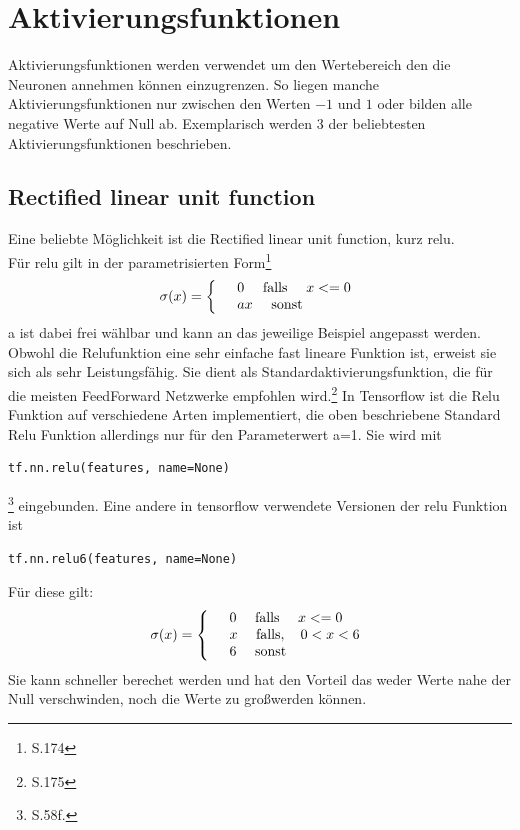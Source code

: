 \section{Aktivierungsfunktionen}
Aktivierungsfunktionen werden verwendet um den Wertebereich den die Neuronen annehmen k\"onnen einzugrenzen. So liegen manche Aktivierungsfunktionen nur zwischen den Werten $-1$ und $1$ oder bilden alle negative Werte auf Null ab. Exemplarisch werden 3 der beliebtesten Aktivierungsfunktionen beschrieben.
\subsection{Rectified linear unit function} \label{sub:relu}
Eine beliebte M\"oglichkeit ist die Rectified linear unit function, kurz relu.\\
F\"ur relu gilt in der parametrisierten Form\footnote{\cite{Goodfellow}S.174 }
\begin{align*}
\sigma(x)=
\left\{
\begin{array}{l l}
& 0 \quad \text{   falls  } \quad x <= 0  \\ 
& ax \quad \text{   sonst}
\end{array}
\right.
\end{align*}
a ist dabei frei w\"ahlbar und kann an das jeweilige Beispiel angepasst werden. Obwohl die Relufunktion eine sehr einfache fast lineare Funktion ist, erweist sie sich als sehr Leistungsf\"ahig. Sie dient als Standardaktivierungsfunktion, die f\"ur die meisten FeedForward Netzwerke empfohlen wird.\footnote{\cite{Goodfellow}S.175 } In Tensorflow ist die Relu Funktion auf verschiedene Arten implementiert, die oben beschriebene Standard Relu Funktion allerdings nur f\"ur den Parameterwert a=1. Sie wird mit
\begin{lstlisting}
tf.nn.relu(features, name=None)
\end{lstlisting}\footnote{\cite{cookbook}S.58f.} 
eingebunden.
Eine andere in tensorflow verwendete Versionen der relu Funktion ist
\begin{lstlisting}
tf.nn.relu6(features, name=None)
\end{lstlisting}\cite{cookbook}
F\"ur diese gilt:
\begin{align*}
	\sigma(x)=
	\left\{
	\begin{array}{l l}
		& 0 \quad \text{   falls  } \quad x <= 0  \\ 
		& x \quad \text{   falls},\quad 0 < x < 6 \\
		& 6 \quad \text{   sonst}
	\end{array}
	\right.
\end{align*}
Sie kann schneller berechet werden und hat den Vorteil das weder Werte nahe der Null verschwinden, noch die Werte zu gro\ss werden k\"onnen.\cite{cookbook} 
